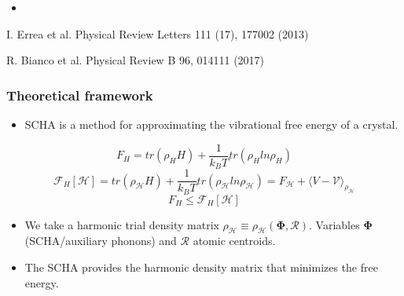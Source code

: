 \documentclass{beamer}
\begin{document}
\begin{frame}
\begin{columns}
\end{columns}
\begin{itemize}
  \item \color{teal}{We apply a variational non-perturbative approach with anharmonic terms to infinite order: Stochastic self-consistent harmonic
  approximation (SSCHA)}
\end{itemize}
 \begin{tiny}
  I. Errea et al. Physical Review Letters 111 (17), 177002 (2013)
 \end{tiny}
 \begin{tiny}
  R. Bianco et al. Physical Review B 96, 014111 (2017)
 \end{tiny}

\end{frame}


\begin{frame}

\frametitle{Theoretical framework}
 \begin{itemize}
  \item SCHA is a method for approximating the vibrational free energy of a crystal.
 \end{itemize}
\begin{equation}
 \nonumber
 F_{H}=tr(\rho_{H}H)+\frac{1}{k_{B}T}tr(\rho_{H}ln\rho_{H}) 
\end{equation}
\begin{equation}
 \nonumber
 \mathcal{F}_{H}[\mathcal{H}]=tr(\rho_{\mathcal{H}}H)+\frac{1}{k_{B}T}tr(\rho_{\mathcal{H}}ln\rho_{\mathcal{H}})=F_{\mathcal{H}}+\langle V-\mathcal{V}\rangle_{\rho_{\mathcal{H}}} 
\end{equation}
\begin{equation}
 \nonumber
 F_{H}\le\mathcal{F}_{H}[\mathcal{H}] 
\end{equation}
\begin{itemize}
	\item We take a harmonic trial density matrix $\rho_{\mathcal{H}}\equiv\rho_{\mathcal{H}}(\boldsymbol{\Phi},\boldsymbol{\mathcal{R}})$. Variables $\boldsymbol{\Phi}$ (SCHA/auxiliary phonons) and $\boldsymbol{\mathcal{R}}$ atomic centroids.
 \item The SCHA provides the harmonic density matrix that minimizes the free energy.
\end{itemize}

\end{frame}
\end{document}
